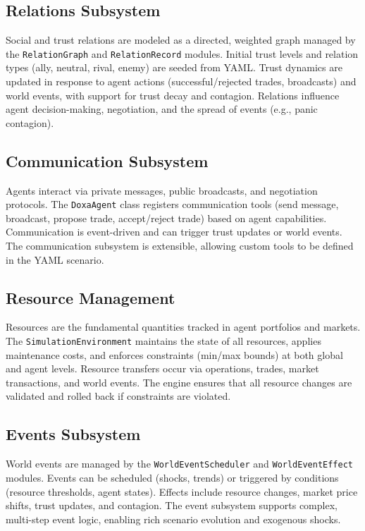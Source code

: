 \documentclass{article}
\begin{document}
\subsection{Relations Subsystem}
Social and trust relations are modeled as a directed, weighted graph managed by the \texttt{RelationGraph} and \texttt{RelationRecord} modules. Initial trust levels and relation types (ally, neutral, rival, enemy) are seeded from YAML. Trust dynamics are updated in response to agent actions (successful/rejected trades, broadcasts) and world events, with support for trust decay and contagion. Relations influence agent decision-making, negotiation, and the spread of events (e.g., panic contagion).

\subsection{Communication Subsystem}
Agents interact via private messages, public broadcasts, and negotiation protocols. The \texttt{DoxaAgent} class registers communication tools (send message, broadcast, propose trade, accept/reject trade) based on agent capabilities. Communication is event-driven and can trigger trust updates or world events. The communication subsystem is extensible, allowing custom tools to be defined in the YAML scenario.

\subsection{Resource Management}
Resources are the fundamental quantities tracked in agent portfolios and markets. The \texttt{SimulationEnvironment} maintains the state of all resources, applies maintenance costs, and enforces constraints (min/max bounds) at both global and agent levels. Resource transfers occur via operations, trades, market transactions, and world events. The engine ensures that all resource changes are validated and rolled back if constraints are violated.

\subsection{Events Subsystem}
World events are managed by the \texttt{WorldEventScheduler} and \texttt{WorldEventEffect} modules. Events can be scheduled (shocks, trends) or triggered by conditions (resource thresholds, agent states). Effects include resource changes, market price shifts, trust updates, and contagion. The event subsystem supports complex, multi-step event logic, enabling rich scenario evolution and exogenous shocks.
\end{document}
